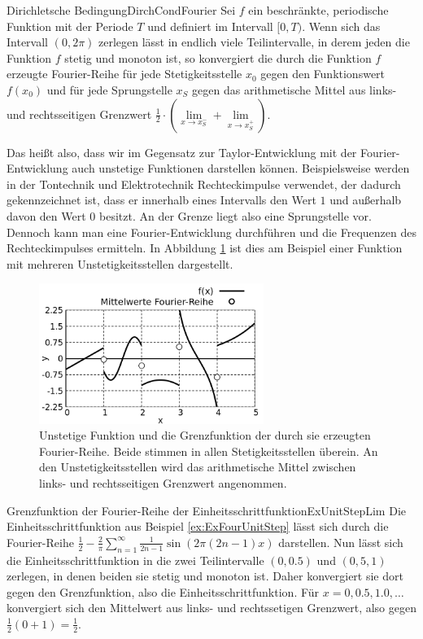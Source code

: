 \begin{statement}{Dirichletsche Bedingung}{DirchCondFourier}
    Sei $f$ ein beschränkte, periodische Funktion mit der Periode $T$ und definiert im Intervall $[0,T)$. Wenn sich das Intervall $(0,2\pi)$ zerlegen lässt in endlich viele Teilintervalle, in derem jeden die Funktion $f$ stetig und monoton ist, so konvergiert die durch die Funktion $f$ erzeugte Fourier-Reihe für jede Stetigkeitsstelle $x_0$ gegen den Funktionswert $f(x_0)$ und für jede Sprungstelle $x_S$ gegen das arithmetische Mittel aus links- und rechtsseitigen Grenzwert $\frac{1}{2} \cdot \left(\lim\limits_{x\to x_S^-} + \lim\limits_{x\to x_S^+}\right)$.
\end{statement}

Das heißt also, dass wir im Gegensatz zur Taylor-Entwicklung mit der Fourier-Entwicklung auch unstetige Funktionen darstellen können. Beispielsweise werden in der Tontechnik und Elektrotechnik Rechteckimpulse verwendet, der dadurch gekennzeichnet ist, dass er innerhalb eines Intervalls den Wert $1$ und außerhalb davon den Wert $0$ besitzt. An der Grenze liegt also eine Sprungstelle vor. Dennoch kann man eine Fourier-Entwicklung durchführen und die Frequenzen des Rechteckimpulses ermitteln. In Abbildung \ref{fig:ExFourierDirichlet} ist dies am Beispiel einer Funktion mit mehreren Unstetigkeitsstellen dargestellt.

\begin{figure}
    \centering
    \includegraphics[width=0.65\textwidth]{./gnuplot/fourier-dirichlet}
    \caption{Unstetige Funktion und die Grenzfunktion der durch sie erzeugten Fourier-Reihe. Beide stimmen in allen Stetigkeitsstellen überein. An den Unstetigkeitsstellen wird das arithmetische Mittel zwischen links- und rechtsseitigen Grenzwert angenommen.}
    \label{fig:ExFourierDirichlet}
\end{figure}

\begin{example}{Grenzfunktion der Fourier-Reihe der Einheitsschrittfunktion}{ExUnitStepLim}
    Die Einheitsschrittfunktion aus Beispiel \ref{ex:ExFourUnitStep} lässt sich durch die Fourier-Reihe $\frac{1}{2} - \frac{2}{\pi} \sum\limits_{n=1}^\infty \frac{1}{2n-1} \sin(2\pi (2n-1) x)$ darstellen. Nun lässt sich die Einheitsschrittfunktion in die zwei Teilintervalle $(0, 0.5)$ und $(0,5, 1)$ zerlegen, in denen beiden sie stetig und monoton ist. Daher konvergiert sie dort gegen den Grenzfunktion, also die Einheitsschrittfunktion. Für $x=0,0.5,1.0,\dots$ konvergiert sich den Mittelwert aus links- und rechtssetigen Grenzwert, also gegen $\frac{1}{2} (0+1) = \frac{1}{2}$.
\end{example}

